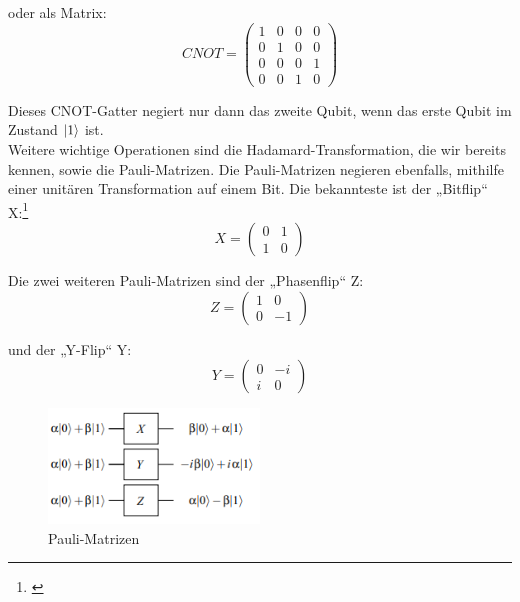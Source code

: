 oder als Matrix:
\begin{equation}
    CNOT =
    \begin{pmatrix}
        1 & 0 & 0 & 0 \\
        0 & 1 & 0 & 0 \\
        0 & 0 & 0 & 1 \\
        0 & 0 & 1 & 0
    \end{pmatrix}
\end{equation}

Dieses CNOT-Gatter negiert nur dann das zweite Qubit, wenn das erste Qubit im Zustand $\ket{1}$ ist.\\

Weitere wichtige Operationen sind die Hadamard-Transformation, die wir bereits kennen, sowie die Pauli-Matrizen.
Die Pauli-Matrizen negieren ebenfalls, mithilfe einer unitären Transformation auf einem Bit.
Die bekannteste ist der „Bitflip“ X:\footnote{\cite[S. 79]{homeister_quantum_2022}}
\begin{equation}
    X =
    \begin{pmatrix}
        0 & 1 \\
        1 & 0
    \end{pmatrix}
\end{equation}

Die zwei weiteren Pauli-Matrizen sind der „Phasenflip“ Z:
\begin{equation}
    Z =
    \begin{pmatrix}
        1 & 0 \\
        0 & -1
    \end{pmatrix}
\end{equation}

und der „Y-Flip“ Y:
\begin{equation}
    Y =
    \begin{pmatrix}
        0 & -i \\
        i & 0
    \end{pmatrix}
\end{equation}

\begin{figure}[H]
    \centering
    \includegraphics[width=0.5\textwidth]{img/Quantengatter Pauli_Matrizen}
    \caption{Pauli-Matrizen}
    \label{fig:pauli-matrizen}
\end{figure}

